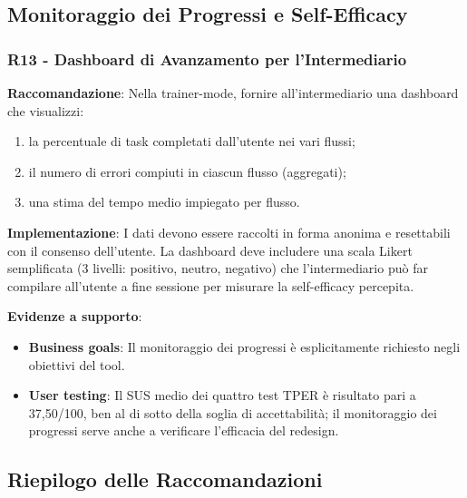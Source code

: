 \documentclass[11pt,a4paper]{article}
\begin{document}

\subsection{Monitoraggio dei Progressi e Self-Efficacy}

\subsubsection{R13 - Dashboard di Avanzamento per l'Intermediario}
\label{rec:R13}

\textbf{Raccomandazione}: Nella trainer-mode, fornire all'intermediario una
dashboard che visualizzi:
\begin{enumerate}
    \item la percentuale di task completati dall'utente nei vari flussi;
    \item il numero di errori compiuti in ciascun flusso (aggregati);
    \item una stima del tempo medio impiegato per flusso.
\end{enumerate}

\textbf{Implementazione}: I dati devono essere raccolti in forma anonima
e resettabili con il consenso dell'utente. La dashboard deve includere una
scala Likert semplificata (3 livelli: positivo, neutro, negativo) che l'intermediario pu\`o far
compilare all'utente a fine sessione per misurare la self-efficacy percepita.

\textbf{Evidenze a supporto}:
\begin{itemize}
    \item \textbf{Business goals}: Il monitoraggio dei progressi \`e esplicitamente
    richiesto negli obiettivi del tool.
    \item \textbf{User testing}: Il SUS medio dei quattro test TPER \`e risultato
    pari a 37,50/100, ben al di sotto della soglia di accettabilit\`a; il
    monitoraggio dei progressi serve anche a verificare l'efficacia del redesign.
\end{itemize}


\newpage
\subsection{Riepilogo delle Raccomandazioni}
\end{document}
